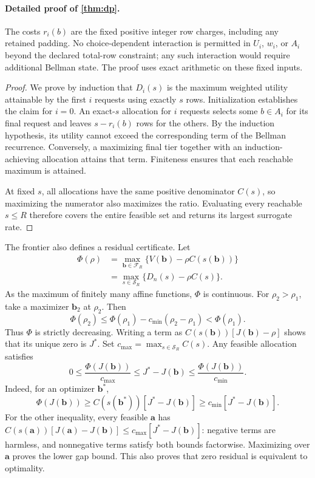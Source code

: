 \documentclass{article}
\begin{document}
\paragraph{Detailed proof of \cref{thm:dp}.}
The costs $r_i(b)$ are the fixed positive integer row charges, including any retained padding. No choice-dependent interaction is permitted in $U_i$, $w_i$, or $A_i$ beyond the declared total-row constraint; any such interaction would require additional Bellman state. The proof uses exact arithmetic on these fixed inputs.
\begin{proof}
We prove by induction that $D_i(s)$ is the maximum weighted utility attainable by the first $i$ requests using exactly $s$ rows. Initialization establishes the claim for $i=0$. An exact-$s$ allocation for $i$ requests selects some $b\in A_i$ for its final request and leaves $s-r_i(b)$ rows for the others. By the induction hypothesis, its utility cannot exceed the corresponding term of the Bellman recurrence. Conversely, a maximizing final tier together with an induction-achieving allocation attains that term. Finiteness ensures that each reachable maximum is attained.

At fixed $s$, all allocations have the same positive denominator $C(s)$, so maximizing the numerator also maximizes the ratio. Evaluating every reachable $s\le R$ therefore covers the entire feasible set and returns its largest surrogate rate.
\end{proof}

The frontier also defines a residual certificate. Let
\begin{equation}
\begin{split}
\Phi(\rho)&=\max_{\boldsymbol b\in\mathcal F_R}
\{V(\boldsymbol b)-\rho C(s(\boldsymbol b))\}\\
&=\max_{s\in\mathcal S_R}\{D_n(s)-\rho C(s)\}.
\end{split}
\label{eq:frontier-residual}
\end{equation}
As the maximum of finitely many affine functions, $\Phi$ is continuous. For $\rho_2>\rho_1$, take a maximizer $\boldsymbol b_2$ at $\rho_2$. Then
\[
\Phi(\rho_2)\le\Phi(\rho_1)-c_{\min}(\rho_2-\rho_1)<\Phi(\rho_1).
\]
Thus $\Phi$ is strictly decreasing. Writing a term as $C(s(\boldsymbol b))[J(\boldsymbol b)-\rho]$ shows that its unique zero is $J^*$. Set $c_{\max}=\max_{s\in\mathcal S_R}C(s)$. Any feasible allocation satisfies
\begin{equation}
0\le\frac{\Phi(J(\boldsymbol b))}{c_{\max}}\le J^*-J(\boldsymbol b)\le\frac{\Phi(J(\boldsymbol b))}{c_{\min}}.
\label{eq:residual}
\end{equation}
Indeed, for an optimizer $\boldsymbol b^*$,
\[
\Phi(J(\boldsymbol b))\ge C(s(\boldsymbol b^*))[J^*-J(\boldsymbol b)]
\ge c_{\min}[J^*-J(\boldsymbol b)].
\]
For the other inequality, every feasible $\boldsymbol a$ has
$C(s(\boldsymbol a))[J(\boldsymbol a)-J(\boldsymbol b)]\le c_{\max}[J^*-J(\boldsymbol b)]$: negative terms are harmless, and nonnegative terms satisfy both bounds factorwise. Maximizing over $\boldsymbol a$ proves the lower gap bound. This also proves that zero residual is equivalent to optimality.
\end{document}
